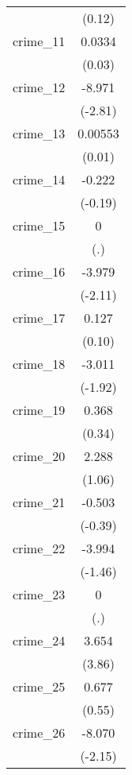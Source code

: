 {\begin{tabular}{l*{1}{c}}
            &      (0.12)         \\
[1em]
crime\_11    &      0.0334         \\
            &      (0.03)         \\
[1em]
crime\_12    &      -8.971\sym{**} \\
            &     (-2.81)         \\
[1em]
crime\_13    &     0.00553         \\
            &      (0.01)         \\
[1em]
crime\_14    &      -0.222         \\
            &     (-0.19)         \\
[1em]
crime\_15    &           0         \\
            &         (.)         \\
[1em]
crime\_16    &      -3.979\sym{*}  \\
            &     (-2.11)         \\
[1em]
crime\_17    &       0.127         \\
            &      (0.10)         \\
[1em]
crime\_18    &      -3.011         \\
            &     (-1.92)         \\
[1em]
crime\_19    &       0.368         \\
            &      (0.34)         \\
[1em]
crime\_20    &       2.288         \\
            &      (1.06)         \\
[1em]
crime\_21    &      -0.503         \\
            &     (-0.39)         \\
[1em]
crime\_22    &      -3.994         \\
            &     (-1.46)         \\
[1em]
crime\_23    &           0         \\
            &         (.)         \\
[1em]
crime\_24    &       3.654\sym{***}\\
            &      (3.86)         \\
[1em]
crime\_25    &       0.677         \\
            &      (0.55)         \\
[1em]
crime\_26    &      -8.070\sym{*}  \\
            &     (-2.15)         \\

\end{tabular}}
